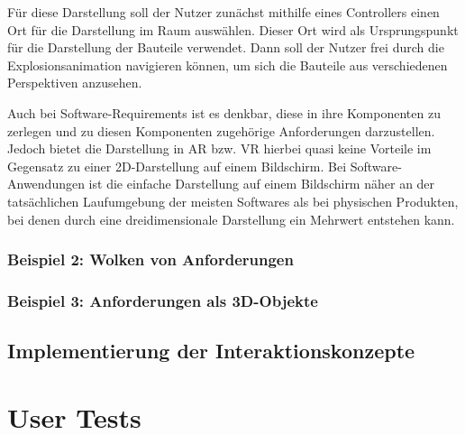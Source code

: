 Für diese Darstellung soll der Nutzer zunächst mithilfe eines Controllers einen Ort für die Darstellung im Raum auswählen.
Dieser Ort wird als Ursprungspunkt für die Darstellung der Bauteile verwendet.
Dann soll der Nutzer frei durch die Explosionsanimation navigieren können, um sich die Bauteile aus verschiedenen Perspektiven anzusehen.

Auch bei Software-Requirements ist es denkbar, diese in ihre Komponenten zu zerlegen und zu diesen Komponenten zugehörige Anforderungen darzustellen.
Jedoch bietet die Darstellung in AR bzw. VR hierbei quasi keine Vorteile im Gegensatz zu einer 2D-Darstellung auf einem Bildschirm.
Bei Software-Anwendungen ist die einfache Darstellung auf einem Bildschirm näher an der tatsächlichen Laufumgebung der meisten Softwares als bei physischen Produkten, bei denen durch eine dreidimensionale Darstellung ein Mehrwert entstehen kann.

\subsubsection{Beispiel 2: Wolken von Anforderungen}

\subsubsection{Beispiel 3: Anforderungen als 3D-Objekte}

\subsection{Implementierung der Interaktionskonzepte}

\section{User Tests}